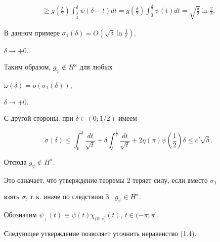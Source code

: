 \begin{exam}
\begin{multline*}
%


\ge g\left(\frac{\delta}{2}\right)\int_{\frac{\delta}{2}}


^\delta\psi(\delta-t)dt=g\left(\frac{\delta}{2}\right)


\int_0^{\frac{\delta}{2}}\psi(t)dt=\sqrt{\frac{\delta}{2}}\ln\frac{2}{\delta}.


\end{multline*}


В данном примере $\sigma_1(\delta)=O(\sqrt\delta\ln\frac{1}{\delta})$,


$\delta\to+0.$


Таким образом, $g_\psi\notin H^\omega$ для любых


$\omega(\delta)=o(\sigma_1(\delta))$,


$\delta\to+0$.


С другой стороны, при $\delta\in(0;1/2)$ имеем


$$


\sigma(\delta)\le\int_0^\delta\frac{dt}{\sqrt t}+


\delta\int_\delta^{\frac{1}{2}}\frac{dt}{\sqrt t}+


2\eta(\pi)\psi\left(\frac{1}{2}\right)\delta\le c'\sqrt \delta.


$$


Отсюда $g_\psi\notin H^\sigma$.


Это означает, что утверждение теоремы 2 теряет силу, если вместо $\sigma_1$


взять $\sigma$, т.\,к. иначе по следствию 3 \ $g_\psi\in H^\sigma$.


\end{exam}





Обозначим $\psi_+(t)\equiv\psi(t)\chi_{(0;\pi]}(t)$, $t\in(-\pi;\pi]$.


Следующее утверждение позволяeт уточнить неравенство (1.4).





